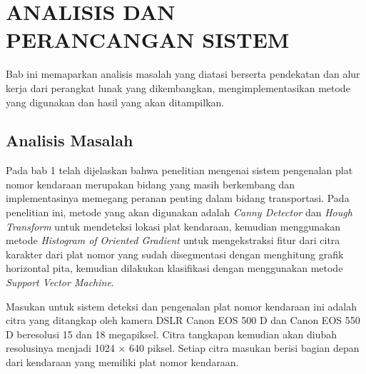 \chapter{ANALISIS DAN PERANCANGAN SISTEM}

%
\vspace{4.5pt}

\noindent Bab ini memaparkan analisis masalah yang diatasi berserta pendekatan dan alur kerja dari perangkat lunak yang dikembangkan, mengimplementasikan metode yang digunakan dan hasil yang akan ditampilkan.
\\
\section{Analisis Masalah}
\noindent Pada bab 1 telah dijelaskan bahwa penelitian mengenai sistem pengenalan plat nomor kendaraan merupakan bidang yang masih berkembang dan implementasinya memegang peranan penting dalam bidang transportasi. Pada penelitian ini, metode yang akan digunakan adalah \textit{Canny Detector} dan \textit{Hough Transform} untuk mendeteksi lokasi plat kendaraan, kemudian menggunakan metode \textit{Histogram of Oriented Gradient} untuk mengekstraksi fitur dari citra karakter dari plat nomor yang sudah disegmentasi dengan menghitung grafik horizontal pita, kemudian dilakukan klasifikasi dengan menggunakan metode \textit{Support Vector Machine}.

\noindent Masukan untuk sistem deteksi dan pengenalan plat nomor kendaraan ini adalah citra yang ditangkap oleh kamera DSLR Canon EOS 500 D dan Canon EOS 550 D beresolusi 15 dan 18 megapiksel. Citra tangkapan kemudian akan diubah resolusinya menjadi 1024 $\times$ 640 piksel. Setiap citra masukan berisi bagian depan dari kendaraan yang memiliki plat nomor kendaraan.

